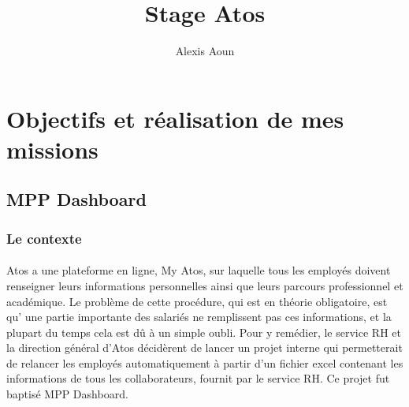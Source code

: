 \documentclass[12pt]{article}
\author {Alexis Aoun}
\begin{document}
\begin {sloppypar}
\title {Stage Atos}
\date {}
\maketitle
\newpage

\section {Objectifs et réalisation de mes missions}
\subsection {MPP Dashboard}
\subsubsection {Le contexte} \paragraph {}
Atos a une plateforme en ligne, My Atos, sur laquelle tous les employés doivent 
renseigner leurs informations personnelles ainsi que leurs parcours professionnel et 
académique. Le problème de cette procédure, qui est en théorie obligatoire, est qu' 
une partie importante des salariés ne remplissent pas ces informations, et la plupart 
du temps cela est dû à un simple oubli. Pour y remédier, le service RH et la direction 
général d'Atos décidèrent de lancer un projet interne qui permetterait de relancer 
les employés automatiquement à partir d'un fichier excel contenant les informations 
de tous les collaborateurs, fournit par le service RH. Ce projet fut baptisé MPP Dashboard.


\end{sloppypar}
\end{document}
